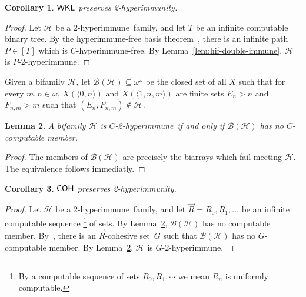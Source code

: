\documentclass{amsart}
\newtheorem{theorem}{Theorem}[section]
\newtheorem{lemma}[theorem]{Lemma}
\newtheorem{corollary}[theorem]{Corollary}
\theoremstyle{definition}
\theoremstyle{remark}
\numberwithin{equation}{section}
\theoremstyle{noparens}
\def\propertyL{2-hyperimmunity}
\def\hyper{2-hyperimmune}
\newcommand{\Bcal}{\mathcal{B}}
\newcommand{\Ccal}{\mathcal{C}}
\newcommand{\Hcal}{\mathcal{H}}
\newcommand{\s}[1]{\ensuremath{\sf{#1}}}
\DeclareMathOperator{\wkl}{\s{WKL}}
\DeclareMathOperator{\coh}{\s{COH}}
\begin{document}
\begin{corollary}\label{cor:wkl-double-immunity}
$\wkl$ preserves \propertyL.
\end{corollary}
\begin{proof}
Let $\Hcal$ be a  \hyper\ family, and let $T$ be an infinite  computable
binary tree. By the hyperimmune-free basis theorem~\cite{Jockusch197201}, there is an infinite
path $P \in [T]$ which is $C$-hyperimmune-free. By Lemma~\ref{lem:hif-double-immune},
$\Hcal$ is $  P$-\hyper.
\end{proof}

Given a bifamily $\Hcal$, let $\Bcal(\Hcal) \subseteq \omega^\omega$
be the closed set of all $X$ such that
for every $m, n \in \omega$, $X(\langle 0,n\rangle)$
and $X(\langle 1,n, m \rangle)$ are finite  sets $E_n > n$ and $F_{n,m} > m$
such that $(E_n, F_{n,m}) \not \in \Hcal$.

\begin{lemma}\label{lem:closed-set-double-immune}
A bifamily $\Hcal$ is $C$-\hyper\ if and only if $\Bcal(\Hcal)$ has no $C$-computable member.
\end{lemma}
\begin{proof}
The members of $\Bcal(\Hcal)$ are precisely the biarrays which fail meeting $\Hcal$.
The equivalence follows immediatly.
\end{proof}




\begin{corollary}\label{cor:coh-preserves-double-immunity}
$\coh$ preserves \propertyL.
\end{corollary}
\begin{proof}
Let $\Hcal$ be a  \hyper\ family, and let $\vec{R} = R_0, R_1, \dots$ be an infinite computable
sequence
\footnote{By a computable sequence of sets $R_0,R_1,\cdots$ we mean
$R_n$ is uniformly computable.} of sets. By Lemma~\ref{lem:closed-set-double-immune}, $\Bcal(\Hcal)$
has no  computable member. By~\cite[Corollary 2.9]{PateyCombinatorial},
there is an $\vec{R}$-cohesive set~$G$ such that $\Bcal(\Hcal)$ has no $ G$-computable member.
By Lemma~\ref{lem:closed-set-double-immune}, $\Hcal$ is $  G$-\hyper.
\end{proof}
\end{document}
